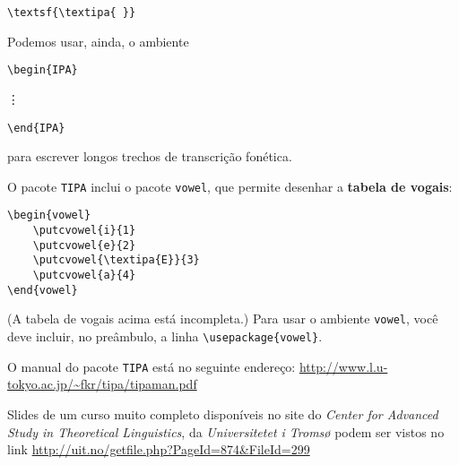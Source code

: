 \begin{center}
\verb+\textsf{\textipa{ }}+ 
\end{center}

Podemos usar, ainda, o ambiente 

\begin{center}
\begin{minipage}[h]{1cm}
\verb+\begin{IPA}+

\vdots

\verb+\end{IPA}+
\end{minipage}
\end{center}

para escrever longos trechos de transcrição fonética.

O pacote \texttt{TIPA} inclui o pacote \texttt{vowel}, que permite desenhar a \textbf{tabela de vogais}:

\begin{center}
\begin{minipage}[h]{.45\textwidth}
\begin{verbatim}
\begin{vowel}
	\putcvowel{i}{1}
	\putcvowel{e}{2}
	\putcvowel{\textipa{E}}{3}
	\putcvowel{a}{4}
\end{vowel}
\end{verbatim}
\end{minipage}
\begin{minipage}[h]{.4\textwidth}
\begin{vowel}
\end{vowel}
\end{minipage}
\end{center}

(A tabela de vogais acima está incompleta.) Para usar o ambiente \texttt{vowel}, você deve incluir, no preâmbulo, a linha \verb+\usepackage{vowel}+.

O manual do pacote \texttt{TIPA} está no seguinte endereço: \href{http://www.l.u-tokyo.ac.jp/~fkr/tipa/tipaman.pdf}{\textsf{http://www.l.u-tokyo.ac.jp/\~{}f\-k\-r/t\-ipa/t\-ipa\-man.pdf}}

Slides de um curso muito completo disponíveis no site do \emph{Center for Advanced Study in Theoretical Linguistics}, da \emph{Universitetet i Troms\o} podem ser vistos no link \href{http://uit.no/getfile.php?PageId=874\&FileId=299}{\textsf{http://uit.no/getfile.php?PageId=874\&FileId=299}} 

